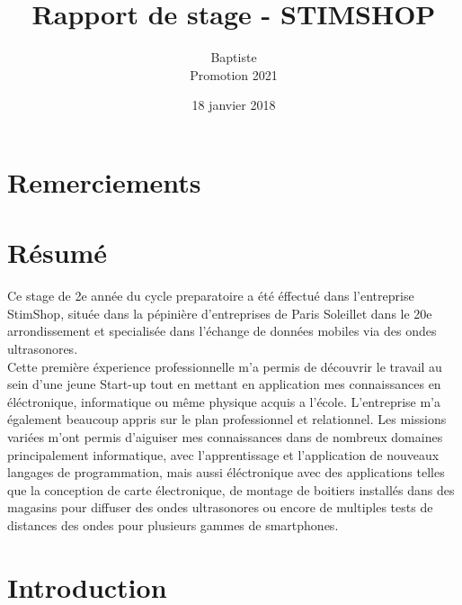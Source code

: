 \documentclass[12pt]{report}
\title{Rapport de stage - STIMSHOP}
\author{Baptiste \bsc{Pillet}\\Promotion 2021}
\date{18 janvier 2018}
\begin{document}
\maketitle


\chapter*{Remerciements}
\newpage
\chapter*{Résumé}
Ce stage de 2e ann\'ee du cycle preparatoire a \'et\'e \'effectu\'e dans l'entreprise StimShop, situ\'ee dans la p\'epini\`ere d'entreprises de Paris Soleillet dans le 20e arrondissement et specialis\'ee dans l'\'echange de donn\'ees mobiles via des ondes ultrasonores. \\

Cette premi\`ere \'experience professionnelle m'a permis de d\'ecouvrir le travail au sein d'une jeune Start-up tout en mettant en application mes connaissances en \'el\'ectronique, informatique ou m\^eme physique acquis a l'\'ecole. L'entreprise m'a \'egalement beaucoup appris sur le plan professionnel et relationnel. Les missions vari\'ees m'ont permis d'aiguiser mes connaissances dans de nombreux domaines principalement informatique, avec l'apprentissage et l'application de nouveaux langages de programmation, mais aussi \'el\'ectronique avec des applications telles que la conception de carte \'electronique, de montage de boitiers install\'es dans des magasins pour diffuser des ondes ultrasonores ou encore de multiples tests de distances des ondes pour plusieurs gammes de smartphones.


\newpage


\renewcommand{\contentsname}{Sommaire}
\tableofcontents

\chapter*{Introduction}
\end{document}
